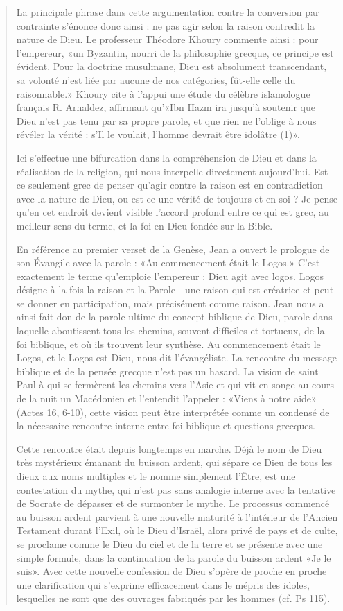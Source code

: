 \begin{quote}
La principale phrase dans cette argumentation contre la conversion par contrainte s'énonce donc ainsi : ne pas agir selon la raison contredit la nature de Dieu. Le professeur Théodore Khoury commente ainsi : pour l'empereur, «un Byzantin, nourri de la philosophie grecque, ce principe est évident. Pour la doctrine musulmane, Dieu est absolument transcendant, sa volonté n'est liée par aucune de nos catégories, fût-elle celle du raisonnable.» Khoury cite à l'appui une étude du célèbre islamologue français R. Arnaldez, affirmant qu'«Ibn Hazm ira jusqu'à soutenir que Dieu n'est pas tenu par sa propre parole, et que rien ne l'oblige à nous révéler la vérité : s'Il le voulait, l'homme devrait être idolâtre (1)».

Ici s'effectue une bifurcation dans la compréhension de Dieu et dans la réalisation de la religion, qui nous interpelle directement aujourd'hui. Est-ce seulement grec de penser qu'agir contre la raison est en contradiction avec la nature de Dieu, ou est-ce une vérité de toujours et en soi ? Je pense qu'en cet endroit devient visible l'accord profond entre ce qui est grec, au meilleur sens du terme, et la foi en Dieu fondée sur la Bible.

En référence au premier verset de la Genèse, Jean a ouvert le prologue de son Évangile avec la parole : «Au commencement était le Logos.» C'est exactement le terme qu'emploie l'empereur : Dieu agit avec logos. Logos désigne à la fois la raison et la Parole - une raison qui est créatrice et peut se donner en participation, mais précisément comme raison. Jean nous a ainsi fait don de la parole ultime du concept biblique de Dieu, parole dans laquelle aboutissent tous les chemins, souvent difficiles et tortueux, de la foi biblique, et où ils trouvent leur synthèse. Au commencement était le Logos, et le Logos est Dieu, nous dit l'évangéliste. La rencontre du message biblique et de la pensée grecque n'est pas un hasard. La vision de saint Paul à qui se fermèrent les chemins vers l'Asie et qui vit en songe au cours de la nuit un Macédonien et l'entendit l'appeler : «Viens à notre aide» (Actes 16, 6-10), cette vision peut être interprétée comme un condensé de la nécessaire rencontre interne entre foi biblique et questions grecques.

Cette rencontre était depuis longtemps en marche. Déjà le nom de Dieu très mystérieux émanant du buisson ardent, qui sépare ce Dieu de tous les dieux aux noms multiples et le nomme simplement l'Être, est une contestation du mythe, qui n'est pas sans analogie interne avec la tentative de Socrate de dépasser et de surmonter le mythe. Le processus commencé au buisson ardent parvient à une nouvelle maturité à l'intérieur de l'Ancien Testament durant l'Exil, où le Dieu d'Israël, alors privé de pays et de culte, se proclame comme le Dieu du ciel et de la terre et se présente avec une simple formule, dans la continuation de la parole du buisson ardent «Je le suis». Avec cette nouvelle confession de Dieu s'opère de proche en proche une clarification qui s'exprime efficacement dans le mépris des idoles, lesquelles ne sont que des ouvrages fabriqués par les hommes (cf. Ps 115).


\end{quote}
